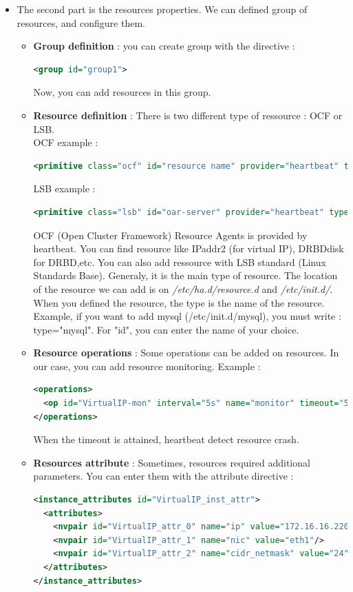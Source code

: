 \documentclass[a4paper,10pt]{report}
\begin{document}
\begin{itemize}
\item The second part is the resources properties. We can defined group of resources, and configure them.

\begin{itemize}
\item \textbf{Group definition} : you can create group with the directive :
\begin{lstlisting}[language=xml]
<group id="group1">
\end{lstlisting}
Now, you can add resources in this group.
\item \textbf{Resource definition} : There is two different type of ressource : OCF or LSB.\\
OCF example : 
\begin{lstlisting}[language=xml]
<primitive class="ocf" id="resource name" provider="heartbeat" type="resource-name">
\end{lstlisting}
LSB example : 
\begin{lstlisting}[language=xml]
<primitive class="lsb" id="oar-server" provider="heartbeat" type="oar-server">
\end{lstlisting}
OCF (Open Cluster Framework) Resource Agents is provided by heartbeat. You can find resource like IPaddr2 (for virtual IP), DRBDdisk for DRBD,etc.
You can also add ressource with LSB standard (Linux Standards Base). Generaly, it is the main type of resource. The location of the resource we can add is on \textit{/etc/ha.d/resource.d} and \textit{/etc/init.d/}.
When you defined the resource, the type is the name of the resource. Example, if you want to add mysql (/etc/init.d/mysql), you must write : type="mysql". For "id", you can enter the name of your choice.
\item \textbf{Resource operations} : Some operations can be added on resources. In our case, you can add resource monitoring. Example :
\begin{lstlisting}[language=xml]
<operations>
  <op id="VirtualIP-mon" interval="5s" name="monitor" timeout="5s"/>
</operations>
\end{lstlisting}
When the timeout is attained, heartbeat detect resource crash.
\item \textbf{Resources attribute} : Sometimes, resources required additional parameters. You can enter them with the attribute directive :
\begin{lstlisting}[language=xml]
<instance_attributes id="VirtualIP_inst_attr">
  <attributes>
    <nvpair id="VirtualIP_attr_0" name="ip" value="172.16.16.220"/>
    <nvpair id="VirtualIP_attr_1" name="nic" value="eth1"/>
    <nvpair id="VirtualIP_attr_2" name="cidr_netmask" value="24"/>
  </attributes>
</instance_attributes>
\end{lstlisting}


\end{itemize}
\end{itemize}
\end{document}
